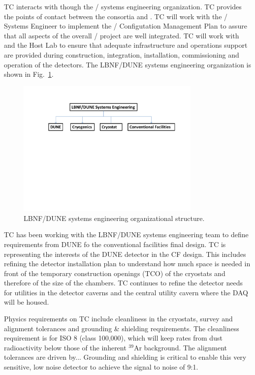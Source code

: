  TC interacts with  though the
/ systems engineering organization. TC
provides the points of contact between the consortia and .
TC will work with the / Systems Engineer to
implement the / Configutation Management Plan
to assure that all aspects of the overall /
project are well integrated. TC will work with  and the
Host Lab to ensure that adequate infrastructure and operations support
are provided during construction, integration, installation,
commissioning and operation of the detectors. The LBNF/DUNE systems
engineering organization is shown in Fig.~\ref{fig:DUNE_SE_org}.
\begin{figure}[htb]
  \begin{center}
    \includegraphics[width=0.8\textwidth]{far-detector-generic/figures/TC_SE_Org_Chart}
    \caption{LBNF/DUNE systems engineering organizational structure.}
    \label{fig:DUNE_SE_org}
  \end{center}
\end{figure}
TC has been working with the LBNF/DUNE systems engineering team to
define requirements from DUNE fo the conventional facilities final
design. TC is representing the interests of the DUNE detector in the
CF design. This includes refining the detector installation plan to
understand how much space is needed in front of the temporary
construction openings (TCO) of the cryostats and therefore of the size
of the chambers. TC continues to refine the detector needs for
utilities in the detector caverns and the central utility cavern where
the DAQ will be housed.

Physics requirements on TC include cleanliness in the cryostats,
survey and alignment tolerances and grounding \& shielding
requirements. The cleanliness requirement is for ISO 8 (class
100,000), which will keep rates from dust radioactivity below those of
the inherent $^39$Ar background. The alignment tolerances are driven
by... Grounding and shielding is critical to enable this very
sensitive, low noise detector to achieve the signal to noise of 9:1.






